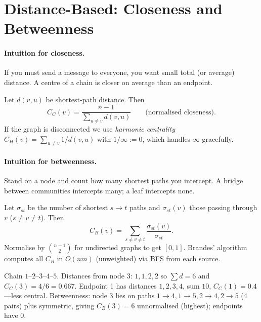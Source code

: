 \section{Distance-Based: Closeness and Betweenness}
\label{sec:closeness-betweenness}
\paragraph{Intuition for closeness.} If you must send a message to everyone, you want small total (or average) distance. A centre of a chain is closer on average than an endpoint.

\begin{definition}\label{def:closeness}
Let $d(v,u)$ be shortest-path distance. Then
\begin{equation}
C_C(v)=\frac{n-1}{\sum_{u\neq v}d(v,u)}\qquad\text{(normalised closeness)}.
\end{equation}
If the graph is disconnected we use \emph{harmonic centrality} $C_H(v)=\sum_{u\neq v}1/d(v,u)$ with $1/\infty:=0$, which handles $\infty$ gracefully.
\end{definition}

\paragraph{Intuition for betweenness.} Stand on a node and count how many shortest paths you intercept. A bridge between communities intercepts many; a leaf intercepts none.

\begin{definition}[Betweenness]\label{def:betweenness}
Let $\sigma_{st}$ be the number of shortest $s\to t$ paths and $\sigma_{st}(v)$ those passing through $v$ ($s\neq v\neq t$). Then
\begin{equation}
C_B(v)=\sum_{s\neq v\neq t}\frac{\sigma_{st}(v)}{\sigma_{st}}.
\end{equation}
Normalise by $\binom{n-1}{2}$ for undirected graphs to get $[0,1]$. Brandes' algorithm computes all $C_B$ in $O(nm)$ (unweighted) via BFS from each source.
\end{definition}

\begin{example}\label{ex:hand-betweenness}
Chain $1$--$2$--$3$--$4$--$5$. Distances from node 3: $1,1,2,2$ so $\sum d=6$ and $C_C(3)=4/6=0.667$. Endpoint 1 has distances $1,2,3,4$, sum $10$, $C_C(1)=0.4$---less central. Betweenness: node 3 lies on paths $1\to4,1\to5,2\to4,2\to5$ (4 pairs) plus symmetric, giving $C_B(3)=6$ unnormalised (highest); endpoints have $0$.
\end{example}


